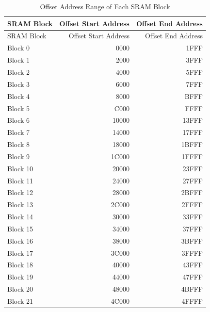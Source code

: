 \documentclass[main\_\_EN.tex]{subfiles}
\begin{document}
\begin{longtable}[c]{|p{3cm}|r|r|}
    \caption{Offset Address Range of Each SRAM Block}
    \label{table:SRAM_block_address}
    \\\hline
    \rowcolor{lightgray}
    SRAM Block & Offset Start Address & Offset End Address \\
    \hline
    \endfirsthead
    \hline
    \rowcolor{lightgray}
    SRAM Block & Offset Start Address & Offset End Address \\
    \hline
    \endhead
    \endfoot
    \hline
    \endlastfoot
    Block 0 & \hexprefix{}0000 & \hexprefix{}1FFF  \\\hline
    Block 1 & \hexprefix{}2000 & \hexprefix{}3FFF  \\\hline
    Block 2 & \hexprefix{}4000 & \hexprefix{}5FFF \\\hline
    Block 3 & \hexprefix{}6000 & \hexprefix{}7FFF  \\\hline
    Block 4 & \hexprefix{}8000 & \hexprefix{}BFFF  \\\hline
    Block 5 & \hexprefix{}C000 & \hexprefix{}FFFF  \\\hline
    Block 6 & \hexprefix{}10000 & \hexprefix{}13FFF  \\\hline
    Block 7 & \hexprefix{}14000 & \hexprefix{}17FFF  \\\hline
    Block 8 & \hexprefix{}18000 & \hexprefix{}1BFFF  \\\hline
    Block 9 & \hexprefix{}1C000 & \hexprefix{}1FFFF  \\\hline
    Block 10 & \hexprefix{}20000 & \hexprefix{}23FFF  \\\hline
    Block 11 & \hexprefix{}24000 & \hexprefix{}27FFF  \\\hline
    Block 12 & \hexprefix{}28000 & \hexprefix{}2BFFF  \\\hline
    Block 13 & \hexprefix{}2C000 & \hexprefix{}2FFFF  \\\hline
    Block 14 & \hexprefix{}30000 & \hexprefix{}33FFF  \\\hline
    Block 15 & \hexprefix{}34000 & \hexprefix{}37FFF  \\\hline
    Block 16 & \hexprefix{}38000 & \hexprefix{}3BFFF  \\\hline
    Block 17 & \hexprefix{}3C000 & \hexprefix{}3FFFF  \\\hline
    Block 18 & \hexprefix{}40000 & \hexprefix{}43FFF  \\\hline
    Block 19 & \hexprefix{}44000 & \hexprefix{}47FFF  \\\hline
    Block 20 & \hexprefix{}48000 & \hexprefix{}4BFFF  \\\hline
    Block 21 & \hexprefix{}4C000 & \hexprefix{}4FFFF  \\\hline

\end{longtable}
\end{document}
